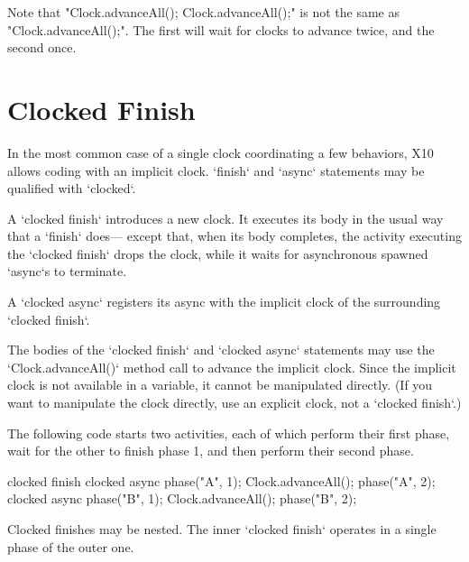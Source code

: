 Note that \xcd"Clock.advanceAll(); Clock.advanceAll();" is not the same as \xcd"Clock.advanceAll();". The
first will wait for clocks to advance twice, and the second
once.  


\section{Clocked Finish}
\label{ClockedFinish}

In the most common case of a single clock coordinating a few behaviors, X10
allows coding with an implicit clock.  \xcd`finish` and \xcd`async` statements
may be qualified with \xcd`clocked`.  

A \xcd`clocked finish` introduces a new clock.  It executes its body in the
usual way that a \xcd`finish` does--- except that, when its body completes,
the activity executing the \xcd`clocked finish` drops the clock, while it
waits for asynchronous spawned \xcd`async`s to terminate.  

A \xcd`clocked async` registers its async with the implicit clock of
the surrounding \xcd`clocked finish`.   

The bodies of the \xcd`clocked finish` and \xcd`clocked async`
statements  may use the
\xcd`Clock.advanceAll()` 
method call to advance the implicit clock.  Since the implicit clock is not
available in a variable, it cannot be manipulated directly. (If you want to
manipulate the clock directly, use an explicit clock, not a \xcd`clocked finish`.)

\begin{ex}
The following code starts two activities, each of which perform their first
phase, wait for the other to finish phase 1, and then perform their second
phase.  
\begin{xten}
clocked finish {
  clocked async {
     phase("A", 1);
     Clock.advanceAll();
     phase("A", 2);
  }
  clocked async {
     phase("B", 1);
     Clock.advanceAll();
     phase("B", 2);
  }
}
\end{xten}
\end{ex}


Clocked finishes may be nested.  The inner \xcd`clocked finish` operates in a
single phase of the outer one.  
